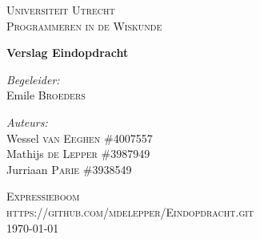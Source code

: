 \documentclass[12pt]{article}
\begin{document}
\begin{titlepage}
\begin{center}

\textsc{\LARGE Universiteit Utrecht}\\[1.6cm]

\textsc{\Large Programmeren in de Wiskunde}\vspace{2pc}

{\huge \bfseries Verslag Eindopdracht}
\vspace{3pc}

\begin{minipage}{0.7\textwidth}
\begin{flushleft} \large
\emph{Begeleider:} \\
Emile \textsc{Broeders} 
\end{flushleft}
\begin{flushleft} \large
\emph{Auteurs:}\\
Wessel \textsc{van Eeghen} \tab\#4007557\\
Mathijs \textsc{de Lepper}  \tab\#3987949\\
Jurriaan \textsc{Parie}  \tab\tab\#3938549
\end{flushleft}
\end{minipage}
\begin{minipage}{0.4\textwidth}
\end{minipage}
\vspace{10pc} 

\textsc{\Large Expressieboom}\\[1.0cm]
\textsc{https://github.com/mdelepper/Eindopdracht.git}\\[2.5cm]
{\large \today}
\end{center}
\end{titlepage}

\newpage
\end{document}

